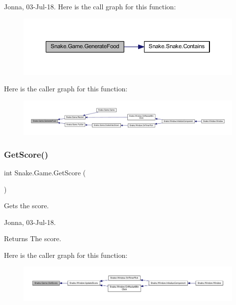 Jonna, 03-\/\+Jul-\/18. Here is the call graph for this function\+:
\nopagebreak
\begin{figure}[H]
\begin{center}
\leavevmode
\includegraphics[width=350pt]{d5/d72/class_snake_1_1_game_ad398a631e2e19d4782c0904ed1af1052_cgraph}
\end{center}
\end{figure}
Here is the caller graph for this function\+:
\nopagebreak
\begin{figure}[H]
\begin{center}
\leavevmode
\includegraphics[width=350pt]{d5/d72/class_snake_1_1_game_ad398a631e2e19d4782c0904ed1af1052_icgraph}
\end{center}
\end{figure}
\mbox{\label{class_snake_1_1_game_a55372fdb6c0351cca92351c5d622a9e0}} 
\subsubsection{\texorpdfstring{Get\+Score()}{GetScore()}}
{\footnotesize\ttfamily int Snake.\+Game.\+Get\+Score (\begin{DoxyParamCaption}{ }\end{DoxyParamCaption})}



Gets the score. 

Jonna, 03-\/\+Jul-\/18. 

\begin{DoxyReturn}{Returns}
The score. 
\end{DoxyReturn}
Here is the caller graph for this function\+:
\nopagebreak
\begin{figure}[H]
\begin{center}
\leavevmode
\includegraphics[width=350pt]{d5/d72/class_snake_1_1_game_a55372fdb6c0351cca92351c5d622a9e0_icgraph}
\end{center}
\end{figure}
\mbox{\label{class_snake_1_1_game_ae1c3c7687934689be99f9894c609b5cb}} 
